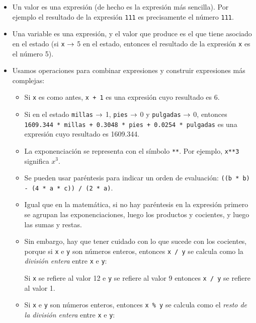 \begin{itemize}
\item Un valor es una expresión (de hecho es la expresión más
sencilla). Por ejemplo el resultado de la expresión \lstinline!111! es
precisamente el número \lstinline!111!.

\item Una variable es una expresión, y el valor que produce es el
que tiene asociado en el estado (si \lstinline!x! $\rightarrow$ 5 en el estado,
entonces el resultado de la expresión \lstinline!x!  es el número 5).

\item Usamos operaciones para combinar expresiones y construir
expresiones más complejas:

\begin{itemize}
\item Si \lstinline!x! es como antes, \lstinline!x + 1! es una expresión cuyo
resultado es 6.

\item Si en el estado \lstinline!millas! $\rightarrow$ 1, \lstinline!pies! $\rightarrow$ 0 y
\lstinline!pulgadas! $\rightarrow$ 0, entonces
\lstinline!1609.344 * millas + 0.3048 * pies + 0.0254 * pulgadas! es una
expresión cuyo resultado es 1609.344.

\item La exponenciación se representa con el símbolo \lstinline!**!. Por
ejemplo, \lstinline!x**3! significa $x^3$.

\item Se pueden usar paréntesis para indicar un orden de
evaluación: \lstinline!((b * b) - (4 * a * c)) / (2 * a)!.

\item Igual que en la matemática, si no hay paréntesis en la
expresión primero se agrupan las exponenciaciones, luego los
productos y cocientes, y luego las sumas y restas.

\item Sin embargo, hay que tener cuidado con lo que sucede con los
cocientes, porque si \lstinline!x! e \lstinline!y! son números enteros,
entonces \lstinline!x / y! se calcula como la {\it división entera}
entre \lstinline!x! e \lstinline!y!:

Si \lstinline!x! se refiere al valor 12 e \lstinline!y! se refiere al valor 9
entonces \lstinline!x / y! se refiere al valor 1.

\item Si \lstinline!x! e \lstinline!y! son números enteros, entonces
\lstinline!x % y!
se calcula como el {\it resto de la división entera} entre \lstinline!x!
e \lstinline!y!:


\end{itemize}
\end{itemize}
